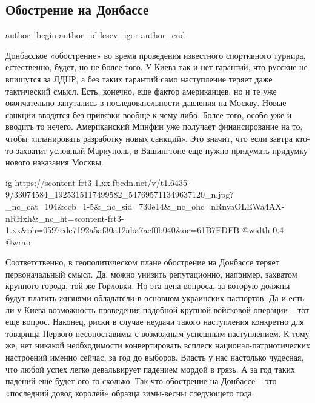  
 
 
 
 
 
\subsection{Обострение на Донбассе}
\label{sec:21_05_2018.fb.lesev_igor.1.obostrenie_na_donbasse}
 
\ifcmt
 author_begin
   author_id lesev_igor
 author_end
\fi

Донбасское «обострение» во время проведения известного спортивного турнира,
естественно, будет, но не более того. У Киева так и нет гарантий, что русские
не впишутся за ЛДНР, а без таких гарантий само наступление теряет даже
тактический смысл. Есть, конечно, еще фактор американцев, но и те уже
окончательно запутались в последовательности давления на Москву. Новые санкции
вводятся без привязки вообще к чему-либо. Более того, особо уже и вводить то
нечего. Американский Минфин уже получает финансирование на то, чтобы
«планировать разработку новых санкций». Это значит, что если завтра кто-то
захватит условный Мариуполь, в Вашингтоне еще нужно придумать придумку нового
наказания Москвы.

\ifcmt
  ig https://scontent-frt3-1.xx.fbcdn.net/v/t1.6435-9/33074584_1925315117499582_547695711349637120_n.jpg?_nc_cat=104&ccb=1-5&_nc_sid=730e14&_nc_ohc=nRnvaOLEWa4AX-nRHxh&_nc_ht=scontent-frt3-1.xx&oh=0597edc7192a5af30a12aba7acf0b040&oe=61B7FDFB
  @width 0.4
  @wrap 
\fi

Соответственно, в геополитическом плане обострение на Донбассе теряет
первоначальный смысл. Да, можно унизить репутационно, например, захватом
крупного города, той же Горловки. Но эта цена вопроса, за которую должны будут
платить жизнями обладатели в основном украинских паспортов. Да и есть ли у
Киева возможность проведения подобной крупной войсковой операции – тот еще
вопрос. Наконец, риски в случае неудачи такого наступления конкретно для
товарища Первого несопоставимы с возможным успешным наступлением. К тому же,
нет никакой необходимости конвертировать всплеск национал-патриотических
настроений именно сейчас, за год до выборов. Власть у нас настолько чудесная,
что любой успех легко девальвирует падением мордой в грязь. А за год таких
падений еще будет ого-го сколько. Так что обострение на Донбассе – это
«последний довод королей» образца зимы-весны следующего года.

